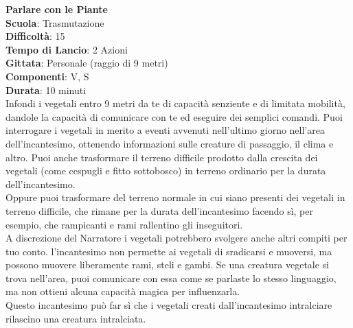 \begin{multicols}{2}
\medskip\textbf{Parlare con le Piante}\\
\textbf{Scuola}: Trasmutazione\\
\textbf{Difficoltà}:  15\\
\textbf{Tempo di Lancio}: 2 Azioni\\
\textbf{Gittata}: Personale (raggio di 9 metri)\\
\textbf{Componenti}: V, S\\
\textbf{Durata}: 10 minuti\\
Infondi i vegetali entro 9 metri da te di capacità senziente e di limitata mobilità, dandole la capacità di comunicare con te ed eseguire dei semplici comandi. Puoi interrogare i vegetali in merito a eventi avvenuti nell'ultimo giorno nell'area dell'incantesimo, ottenendo informazioni sulle creature di passaggio, il clima e altro. Puoi anche trasformare il terreno difficile prodotto dalla crescita dei vegetali (come cespugli e fitto sottobosco) in terreno ordinario per la durata dell'incantesimo.\\
Oppure puoi trasformare del terreno normale in cui siano presenti dei vegetali in terreno difficile, che rimane per la durata dell'incantesimo facendo sì, per esempio, che rampicanti e rami rallentino gli inseguitori. \\
A discrezione del Narratore i vegetali potrebbero svolgere anche altri compiti per tuo conto. l'incantesimo non permette ai vegetali di sradicarsi e muoversi, ma possono muovere liberamente rami, steli e gambi. Se una creatura vegetale si trova nell'area, puoi comunicare con essa come se parlaste lo stesso linguaggio, ma non ottieni alcuna capacità magica per influenzarla.\\
Questo incantesimo può far sì che i vegetali creati dall'incantesimo intralciare rilascino una creatura intralciata. 


\end{multicols}
